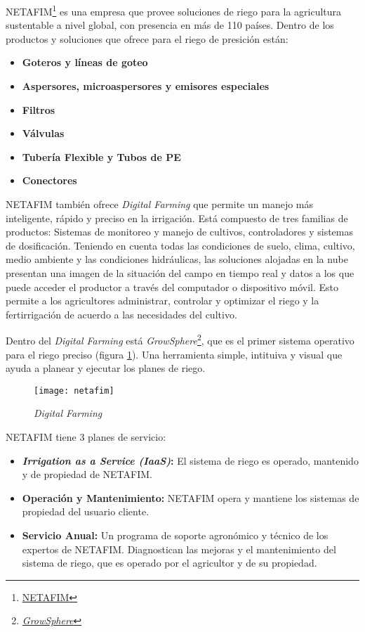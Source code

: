 NETAFIM\footnote{\href{https://www.netafim.com/en/}{NETAFIM}} es una empresa que provee soluciones de riego para la agricultura sustentable a nivel global, con presencia en más de 110 países.
Dentro de los productos y soluciones que ofrece para el riego de presición están:
\begin{itemize}
    \item \textbf{Goteros y líneas de goteo} 
    \item \textbf{Aspersores, microaspersores y emisores especiales}
    \item \textbf{Filtros}
    \item \textbf{Válvulas}
    \item \textbf{Tubería Flexible y Tubos de PE}
    \item \textbf{Conectores}        
\end{itemize}
NETAFIM también ofrece \textit{Digital Farming} que permite un manejo más inteligente, rápido y preciso en la irrigación. Está compuesto de tres familias de productos: Sistemas de monitoreo y manejo de cultivos, controladores y sistemas de dosificación.
Teniendo en cuenta todas las condiciones de suelo, clima, cultivo, medio ambiente y las condiciones hidráulicas, las soluciones alojadas en la nube presentan una imagen de la situación del campo en tiempo real y datos a los que puede acceder el productor a través del computador o dispositivo móvil. Esto permite a los agricultores administrar, controlar y optimizar el riego y la fertirrigación de acuerdo a las necesidades del cultivo.

Dentro del \textit{Digital Farming} está \textit{GrowSphere}\footnote{\href{https://www.netafim.com/en/digital-farming/}{\textit{GrowSphere}}}, que es el primer sistema operativo para el riego preciso (figura \ref{fig:netafim}). Una herramienta simple, intituiva y visual que ayuda a planear y ejecutar los planes de riego.
\begin{figure}[H]
	\centering
	\texttt{[image: netafim]}
	\caption{\label{fig:netafim} \textit{Digital Farming}}
\end{figure}

NETAFIM tiene 3 planes de servicio:
\begin{itemize}
    \item \textbf{\textit{Irrigation as a Service (IaaS)}:} El sistema de riego es operado, mantenido y de propiedad de NETAFIM. 
    \item \textbf{Operación y Mantenimiento:} NETAFIM opera y mantiene los sistemas de propiedad del usuario cliente.
    \item \textbf{Servicio Anual:} Un programa de soporte agronómico y técnico de los expertos de NETAFIM. Diagnostican las mejoras y el mantenimiento del sistema de riego, que es operado por el agricultor y de su propiedad.
\end{itemize}

